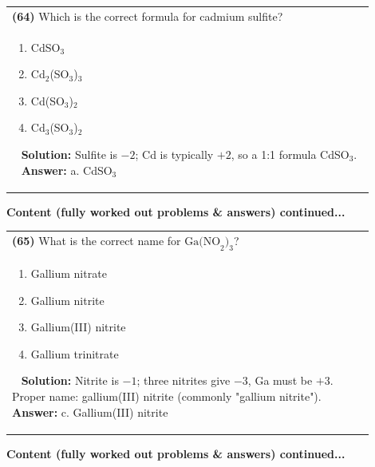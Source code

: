 \documentclass{article}
\begin{document}
\begin{tabular}{|p{0.9\linewidth}|}
\hline
\vspace{0.2cm}
\textbf{(64)} Which is the correct formula for cadmium sulfite? \\
\begin{minipage}[t]{0.85\linewidth}
\begin{enumerate}[label=\alph*.]
\item CdSO$_3$ \
\item Cd$_2$(SO$_3$)$_3$ \
\item Cd(SO$_3$)$_2$ \
\item Cd$_3$(SO$_3$)$_2$
\end{enumerate}
\end{minipage}\
\hline
\vspace{0.2cm}
\textbf{Solution:} Sulfite is $-2$; Cd is typically $+2$, so a 1:1 formula CdSO$_3$. \
\hline
\vspace{0.2cm}
\textbf{Answer:} a. CdSO$_3$ \
\hline
\end{tabular}
\newpage
\noindent
{\large\textbf{Content (fully worked out problems & answers) continued...}}\\[0.2em]
\begin{tabular}{|p{0.9\linewidth}|}
\hline
\vspace{0.2cm}
\textbf{(65)} What is the correct name for $\text{Ga(NO}_2)_3$? \\
\begin{minipage}[t]{0.85\linewidth}
\begin{enumerate}[label=\alph*.]
\item Gallium nitrate \
\item Gallium nitrite \
\item Gallium(III) nitrite \
\item Gallium trinitrate
\end{enumerate}
\end{minipage}\
\hline
\vspace{0.2cm}
\textbf{Solution:} Nitrite is $-1$; three nitrites give $-3$, Ga must be $+3$. Proper name: gallium(III) nitrite (commonly "gallium nitrite"). \
\hline
\vspace{0.2cm}
\textbf{Answer:} c. Gallium(III) nitrite \
\hline
\end{tabular}
\newpage
\noindent
{\large\textbf{Content (fully worked out problems & answers) continued...}}\\[0.2em]
\end{document}
